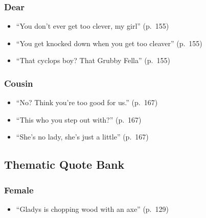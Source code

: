 \documentclass[a4paper]{article}
\begin{document}
\subsubsection{Dear}
\begin{itemize}
    \item ``You don’t ever get too clever, my girl'' (p.~155)
    \item ``You get knocked down when you get too cleaver'' (p.~155)
    \item ``That cyclops boy? That Grubby Fella'' (p.~155)
\end{itemize}

\subsubsection{Cousin}
\begin{itemize}
    \item ``No? Think you’re too good for us.'' (p.~167)
    \item ``This who you step out with?'' (p.~167)
    \item ``She’s no lady, she’s just a little'' (p.~167)
\end{itemize}

\subsection{Thematic Quote Bank}
\subsubsection{Female}
\begin{itemize}
    \item ``Gladys is chopping wood with an axe'' (p.~129)
\end{itemize}
\end{document}
